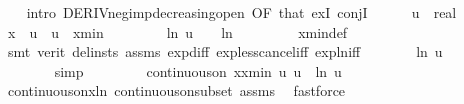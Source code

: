 \begin{isabellebody}
\ \ \isamarkupfalse%
\ {\isacharparenleft}{\kern0pt}intro\ DERIV{\isacharunderscore}{\kern0pt}neg{\isacharunderscore}{\kern0pt}imp{\isacharunderscore}{\kern0pt}decreasing{\isacharunderscore}{\kern0pt}open\ {\isacharbrackleft}{\kern0pt}OF\ that{\isacharbrackright}{\kern0pt}\ exI\ conjI{\isacharparenright}{\kern0pt}\isanewline
\ \ \ \ \isamarkupfalse%
\ u\ {\isacharcolon}{\kern0pt}{\isacharcolon}{\kern0pt}\ real\isanewline
\ \ \ \ \isamarkupfalse%
\ {\isachardoublequoteopen}x\ {\isacharless}{\kern0pt}\ u{\isachardoublequoteclose}\ \ {\isachardoublequoteopen}u\ {\isacharless}{\kern0pt}\ xmin{\isachardoublequoteclose}\ \isanewline
\ \ \ \ \isamarkupfalse%
\ \isamarkupfalse%
\ {\isachardoublequoteopen}ln\ u\ {\isacharplus}{\kern0pt}\ {}\ {\isacharless}{\kern0pt}\ ln\ {}{\isachardoublequoteclose}\isanewline
\ \ \ \ \ \ \isamarkupfalse%
\ xmin{\isacharunderscore}{\kern0pt}def\isanewline
\ \ \ \ \ \ \isamarkupfalse%
\ {\isacharparenleft}{\kern0pt}smt\ {\isacharparenleft}{\kern0pt}verit{\isacharcomma}{\kern0pt}\ del{\isacharunderscore}{\kern0pt}insts{\isacharparenright}{\kern0pt}\ assms\ exp{\isacharunderscore}{\kern0pt}diff\ exp{\isacharunderscore}{\kern0pt}less{\isacharunderscore}{\kern0pt}cancel{\isacharunderscore}{\kern0pt}iff\ exp{\isacharunderscore}{\kern0pt}ln{\isacharunderscore}{\kern0pt}iff{\isacharparenright}{\kern0pt}\isanewline
\ \ \ \ \isamarkupfalse%
\ \isamarkupfalse%
\ {\isachardoublequoteopen}ln\ u\ {\isacharplus}{\kern0pt}\ {}\ {\isacharless}{\kern0pt}\ {}{\isachardoublequoteclose}\isanewline
\ \ \ \ \ \ \isamarkupfalse%
\ simp\isanewline
\ \ \isamarkupfalse%
\isanewline
\ \ \ \ \isamarkupfalse%
\ {\isachardoublequoteopen}continuous{\isacharunderscore}{\kern0pt}on\ {\isacharbraceleft}{\kern0pt}x{\isachardot}{\kern0pt}{\isachardot}{\kern0pt}xmin{\isacharbraceright}{\kern0pt}\ {\isacharparenleft}{\kern0pt}{\isasymlambda}u{\isachardot}{\kern0pt}\ u\ {\isacharasterisk}{\kern0pt}\ ln\ u{\isacharparenright}{\kern0pt}{\isachardoublequoteclose}\isanewline
\ \ \ \ \ \ \isamarkupfalse%
\ continuous{\isacharunderscore}{\kern0pt}on{\isacharunderscore}{\kern0pt}x{\isacharunderscore}{\kern0pt}ln\ continuous{\isacharunderscore}{\kern0pt}on{\isacharunderscore}{\kern0pt}subset\ assms\ \isamarkupfalse%
\ fastforce\isanewline

\end{isabellebody}

